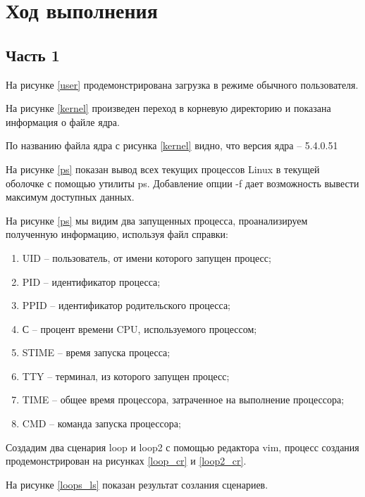 \section{Ход выполнения}
\subsection{Часть 1}

На рисунке \ref{user} продемонстрирована загрузка в режиме обычного пользователя.

На рисунке \ref{kernel} произведен переход в корневую директорию и показана информация о файле ядра.

По названию файла ядра с рисунка \ref{kernel} видно, что версия ядра -- 5.4.0.51

На рисунке \ref{ps} показан вывод всех текущих процессов Linux в текущей оболочке с помощью утилиты ps. Добавление опции -f дает возможность вывести максимум доступных данных.

На рисунке \ref{ps} мы видим два запущенных процесса, проанализируем полученную информацию, используя файл справки:

\begin{enumerate}
    \item UID -- пользователь, от имени которого запущен процесс;
    \item PID -- идентификатор процесса;
    \item PPID -- идентификатор родительского процесса;
    \item С -- процент времени CPU, используемого процессом;
    \item STIME -- время запуска процесса;
    \item TTY -- терминал, из которого запущен процесс;
    \item TIME -- общее время процессора, затраченное на выполнение процессора;
    \item CMD -- команда запуска процессора;
\end{enumerate}

Создадим два сценария loop и loop2 с помощью редактора vim, процесс создания продемонстрирован на рисунках \ref{loop_cr} и \ref{loop2_cr}.


На рисунке \ref{loops_ls} показан результат созлания сценариев.

